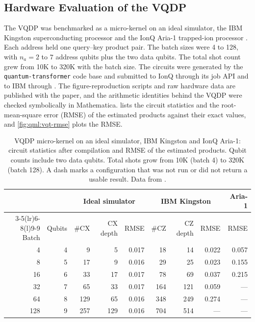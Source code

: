 \subsection{Hardware Evaluation of the VQDP}\label{sec:qml:vqt:hw}

The VQDP was benchmarked as a micro-kernel on an ideal simulator, the IBM Kingston superconducting processor and the IonQ Aria-1 trapped-ion processor \cite{guo2025vqt}. Each address held one query--key product pair. The batch sizes were 4 to 128, with $n_a = 2$ to $7$ address qubits plus the two data qubits. The total shot count grew from 10K to 320K with the batch size. The circuits were generated by the \texttt{quantum-transformer} code base and submitted to IonQ through its job API and to IBM through \qiskit{}. The figure-reproduction scripts and raw hardware data are published with the paper, and the arithmetic identities behind the VQDP were checked symbolically in Mathematica.  lists the circuit statistics and the root-mean-square error (RMSE) of the estimated products against their exact values, and \cref{fig:qml:vqt-rmse} plots the RMSE.

\begin{table}[htbp]
\caption{VQDP micro-kernel on an ideal simulator, IBM Kingston and IonQ Aria-1: circuit statistics after compilation and RMSE of the estimated products. Qubit counts include two data qubits. Total shots grow from 10K (batch 4) to 320K (batch 128). A dash marks a configuration that was not run or did not return a usable result. Data from \cite{guo2025vqt}.}\label{tab:qml:vqt-hw}
\centering
\footnotesize
\begin{tabular}{@{}rr rrr rrr r@{}}
\toprule
& & \multicolumn{3}{c}{Ideal simulator} & \multicolumn{3}{c}{IBM Kingston} & Aria-1 \\
\cmidrule(lr){3-5}\cmidrule(lr){6-8}\cmidrule(l){9-9}
Batch & Qubits & \#CX & CX depth & RMSE & \#CZ & CZ depth & RMSE & RMSE \\
\midrule
4   & 4 & 9   & 5   & 0.017 & 18  & 14  & 0.022 & 0.057 \\
8   & 5 & 17  & 9   & 0.016 & 29  & 25  & 0.023 & 0.155 \\
16  & 6 & 33  & 17  & 0.017 & 78  & 69  & 0.037 & 0.215 \\
32  & 7 & 65  & 33  & 0.017 & 164 & 121 & 0.059 & --- \\
64  & 8 & 129 & 65  & 0.016 & 348 & 249 & 0.274 & --- \\
128 & 9 & 257 & 129 & 0.016 & 704 & 514 & ---   & --- \\
\bottomrule
\end{tabular}
\end{table}

